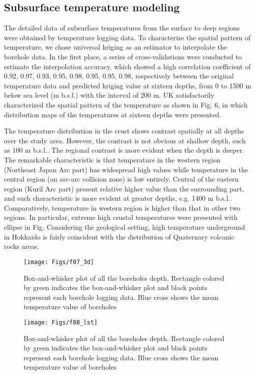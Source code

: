 
\subsection{Subsurface temperature modeling}

The detailed data of subsurface temperatures from the surface to deep regions were obtained by temperature logging data. To characterize the spatial pattern of temperature, we chose universal kriging as an estimator to interpolate the borehole data. In the first place, a series of cross-validations were conducted to estimate the interpolation accuracy, which showed a high correlation coefficient of 0.92, 0.97, 0.93, 0.95, 0.98, 0.95, 0.95, 0.98, respectively between the original temperature data and predicted kriging value at sixteen depths, from 0 to 1500 m below sea level (m b.s.l.) with the interval of 200 m. UK satisfactorily characterized the spatial pattern of the temperature as shown in Fig. 6, in which distribution maps of the temperatures at sixteen depths were presented. 

The temperature distribution in the crust shows contrast spatially at all depths over the study area. However, the contrast is not obvious at shallow depth, such as 100 m b.s.l.. The regional contrast is more evident when the depth is deeper. The remarkable characteristic is that temperature in the western region (Northeast Japan Arc part) has widespread high values while temperature in the central region (an arc-arc collision zone) is low entirely. Central of the eastern region (Kuril Arc part) present relative higher value than the surrounding part, and such characteristic is more evident at greater depths, e.g. 1400 m b.s.l.. Comparatively, temperature in western region is higher than that in other two regions. In particular, extreme high crustal temperatures were presented with ellipse in Fig. Considering the geological setting, high temperature underground in Hokkaido is fairly coincident with the distribution of Quaternary volcanic rocks areas.  
\begin{figure} [ht!]
    \texttt{[image: Figs/f07\_3d]}
  \caption{Box-and-whisker plot of all the boreholes depth. Rectangle colored by green indicates the box-and-whisker plot and black points represent each borehole logging data. Blue cross shows the mean temperature value of boreholes}
  \label{fig:3d}
\end{figure}
 
\begin{figure} [ht!]
    \texttt{[image: Figs/f08\_lst]}
  \caption{Box-and-whisker plot of all the boreholes depth. Rectangle colored by green indicates the box-and-whisker plot and black points represent each borehole logging data. Blue cross shows the mean temperature value of boreholes}
  \label{fig:lst}
\end{figure}

